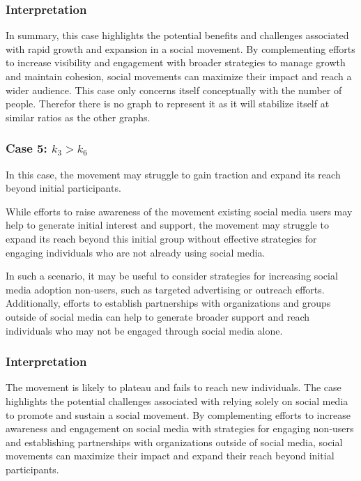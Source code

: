 \documentclass{article}
\begin{document}
    \subsubsection*{Interpretation} In summary,  this case highlights the potential benefits and challenges associated with rapid growth and expansion in a social movement. By complementing efforts to increase visibility and engagement with broader strategies to manage growth and maintain cohesion, social movements can maximize their impact and reach a wider audience.
    This case only concerns itself conceptually with the number of people. Therefor there is no graph to represent it as it will stabilize itself at similar ratios as the other graphs.

    \subsubsection*{Case 5: $k_3 > k_6$}
    In this case, the movement may struggle to gain traction and expand its reach beyond initial participants.
    
    While efforts to raise awareness of the movement  existing social media users may help to generate initial interest and support, the movement may struggle to expand its reach beyond this initial group without effective strategies for engaging individuals who are not already using social media.
    
    In such a scenario, it may be useful to consider strategies for increasing social media adoption  non-users, such as targeted advertising or outreach efforts. Additionally, efforts to establish partnerships with organizations and groups outside of social media can help to generate broader support and reach individuals who may not be engaged through social media alone.
    \subsubsection*{Interpretation}
    The movement is likely to plateau and fails to reach new individuals. The case highlights the potential challenges associated with relying solely on social media to promote and sustain a social movement. By complementing efforts to increase awareness and engagement on social media with strategies for engaging non-users and establishing partnerships with organizations outside of social media, social movements can maximize their impact and expand their reach beyond initial participants.
\end{document}

